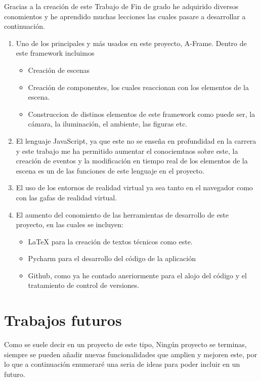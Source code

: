\documentclass[a4paper, 12pt]{book}
\begin{document}
Gracias a la creación de este Trabajo de Fin de grado he adquirido diversos conomientos y he aprendido muchas lecciones las cuales pasare a desarrollar a continuación.
\begin{enumerate}
  \item Uno de los principales y más usados en este proyecto, A-Frame. Dentro de este framework incluimos
  \begin{itemize}
      \item Creación de escenas
      \item Creación de componentes, los cuales reaccionan con los elementos de la escena.
      \item Construccion de distinos elementos de este framework como puede ser, la cámara, la iluminación, el ambiente, las figuras etc.
  \end{itemize}
  \item El lenguaje JavaScript, ya que este no se enseña en profundidad en la carrera y este trabajo me ha permitido aumentar el conociemtnos sobre este, la creación de eventos y la modificación en tiempo real de los elementos de la escena es un de las funciones de este lenguaje en el proyecto.
  \item El uso de los entornos de realidad virtual ya sea tanto en el navegador como con las gafas de realidad virtual.
  \item El aumento del conomiento de las herramientas de desarrollo de este proyecto, en las cuales se incluyen:
  \begin{itemize}
      \item LaTeX para la creación de textos técnicos como este.
      \item Pycharm para el desarrollo del código de la aplicación
      \item Github, como ya he contado aneriormente para el alojo del código y el tratamiento de control de versiones.
  \end{itemize}
\end{enumerate}


\section{Trabajos futuros}
\label{sec:trabajos_futuros}

Como se suele decir en un proyecto de este tipo, Ningún proyecto se terminas, siempre se pueden añadir nuevas funcionalidades que amplien y mejoren este, por lo que a continuación enumeraré una seria de ideas para poder incluir en un futuro.
\end{document}
